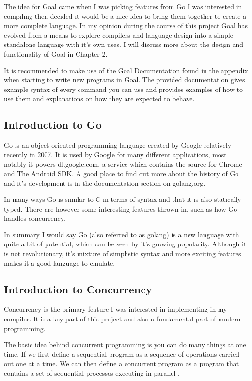 The idea for Goal came when I was picking features from Go I was interested in compiling then decided it would be a nice idea to bring them together to create a more complete language. In my opinion during the course of this project Goal has evolved from a means to explore compilers and language design into a simple standalone language with it's own uses. I will discuss more about the design and functionality of Goal in Chapter 2.

It is recommended to make use of the Goal Documentation found in the appendix when starting to write new programs in Goal. The provided documentation gives example syntax of every command you can use and provides examples of how to use them and explanations on how they are expected to behave.

\subsection{Introduction to Go}

Go is an object oriented programming language created by Google relatively recently in 2007. It is used by Google for many different applications, most notably it powers dl.google.com, a service which contains the source for Chrome and The Android SDK. A good place to find out more about the history of Go and it's development is in the documentation section on golang.org.

In many ways Go is similar to C in terms of syntax and that it is also statically typed. There are however some interesting features thrown in, such as how Go handles concurrency.

In summary I would say Go (also referred to as golang) is a new language with quite a bit of potential, which can be seen by it's growing popularity. Although it is not revolutionary, it's mixture of simplistic syntax and more exciting features makes it a good language to emulate.


\subsection{Introduction to Concurrency}

Concurrency is the primary feature I was interested in implementing in my compiler. It is a key part of this project and also a fundamental part of modern programming. 

The basic idea behind concurrent programming is you can do many things at one time. If we first define a sequential program as a sequence of operations carried out one at a time. We can then define a concurrent program as a program that contains a set of sequential processes executing in parallel \cite[p.~414]{CompGen1997}.

